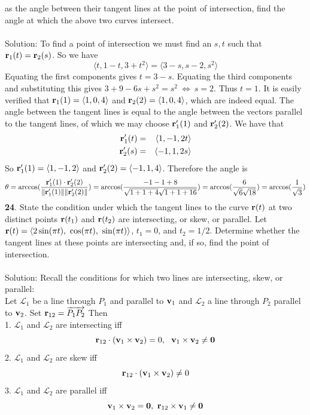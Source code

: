 \documentclass[12pt]{amsbook}
\newcommand{\la}{\langle}
\newcommand{\ra}{\rangle}
\begin{document}
as the angle between their tangent lines at the point of intersection, find the
angle at which the above two curves intersect.
\\
\\
{\sc Solution}: To find a point of intersection we must find an $s,t$ such that ${\bf r}_1(t)={\bf r}_2(s)$. So we have
$$\la t,1-t, 3+t^2 \ra = \la 3-s, s-2, s^2 \ra$$
Equating the first components gives $t=3-s$. Equating the third components and substituting this gives $3+9-6s+s^2=s^2 \ \Leftrightarrow \ s=2$. Thus $t=1$. It is easily verified that ${\bf r}_1(1)=\la 1,0,4 \ra$ and ${\bf r}_2(2)=\la 1,0,4 \ra$, which are indeed equal. The angle between the tangent lines is equal to the angle between the vectors parallel to the tangent lines, of which we may choose ${\bf r}_1'(1)$ and ${\bf r}_2'(2)$. We have that
\begin{eqnarray*}
{\bf r}_1'(t)&=&\la 1,-1, 2t \ra\\
{\bf r}_2'(s)&=&\la -1,1,2s \ra
\end{eqnarray*}
So ${\bf r}_1'(1)=\la 1,-1,2 \ra$ and ${\bf r}_2'(2)=\la -1,1,4 \ra$. Therefore the angle is
$$\theta=\arccos(\frac{{\bf r}_1'(1)\cdot{\bf r}_2'(2)}{\|{\bf r}_1'(1)\|\|{\bf r}_2'(2)\|})=\arccos(\frac{-1-1+8}{\sqrt{1+1+4}\sqrt{1+1+16}})=\arccos(\frac{6}{\sqrt{6}\sqrt{18}})=\arccos(\frac{1}{\sqrt{3}})$$
{\small\bf 24}. State the condition under which the tangent lines to the curve ${\bf r}(t)$
at two distinct points ${\bf r}(t_1)$ and ${\bf r}(t_2)$ are intersecting, or skew, or parallel.
Let ${\bf r}(t)=\la 2\sin(\pi t), \ \cos(\pi t), \ \sin(\pi t) \ra$, $t_1 = 0$, and $t_2 = 1/2$. Determine whether the tangent lines at these points are intersecting and, if so, find the
point of intersection.
\\
\\
{\sc Solution}: Recall the conditions for which two lines are intersecting, skew, or parallel:
\\
Let $\mathcal{L}_1$ be a line through $P_1$ and parallel to ${\bf v}_1$ and $\mathcal{L}_2$ a line through $P_2$ parallel to ${\bf v}_2$. Set ${\bf r}_{12}=\overrightarrow{P_1P_2}$ Then
\\
1. $\mathcal{L}_1$ and $\mathcal{L}_2$ are intersecting iff
$${\bf r}_{12}\cdot({\bf v}_1\times{\bf v}_2)= 0, \ \ {\bf v}_1\times{\bf v}_2 \neq {\bf 0}$$
2. $\mathcal{L}_1$ and $\mathcal{L}_2$ are skew iff
$${\bf r}_{12}\cdot({\bf v}_1\times{\bf v}_2)\neq 0$$
3. $\mathcal{L}_1$ and $\mathcal{L}_2$ are parallel iff
$${\bf v}_1\times{\bf v}_2={\bf 0}, \ {\bf r}_{12}\times{\bf v}_1 \neq {\bf 0}$$
\end{document}
